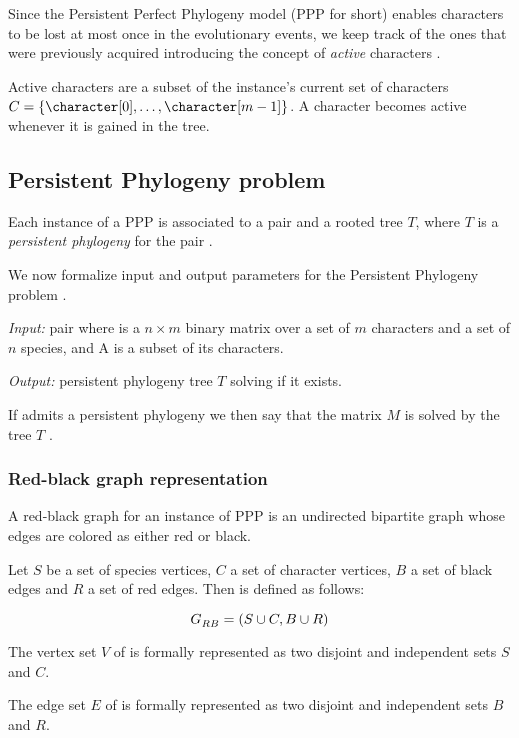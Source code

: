 Since the Persistent Perfect Phylogeny model (PPP for short) enables characters to be lost at most once in the evolutionary events, we keep track of the ones that were previously acquired introducing the concept of \emph{active} characters \cite{PPPbin2012, PPPcgraph2016, PPPptime2016}.

Active characters are a subset of the instance's current set of characters $C = \{ \character[0], \dots, \character[m-1] \}$.
A character becomes active whenever it is gained in the tree.

\subsection{Persistent Phylogeny problem}\label{section:ppp}

Each instance of a PPP is associated to a pair \ma{} and a rooted tree $T$, where $T$ is a \emph{persistent phylogeny} for the pair \ma{}.

We now formalize input and output parameters for the Persistent Phylogeny problem \cite{PPPptime2016}.

\begin{definition}\label{definition:ppp}
  \text{}

  \textit{Input:} pair \ma{} where \m{} is a $n \times m$ binary matrix over a set of $m$ characters and a set of $n$ species, and A is a subset of its characters.

  \textit{Output:} persistent phylogeny tree $T$ solving \m{} if it exists.
\end{definition}

If \ma{} admits a persistent phylogeny we then say that the matrix $M$ is solved by the tree $T$ \cite{PPPptime2016,PPPcgraph2016}.

\subsubsection{Red-black graph representation}\label{section:grb}

A red-black graph for an instance of PPP is an undirected bipartite graph whose edges are colored as either red or black.

\begin{definition}\label{definition:grb}
  Let $S$ be a set of species vertices, $C$ a set of character vertices, $B$ a set of black edges and $R$ a set of red edges.
  Then \grb{} is defined as follows:

  \[ G_{RB}^{}{} = (S \cup C, B \cup R) \]

  The vertex set $V$ of \grb{} is formally represented as two disjoint and independent sets $S$ and $C$.

  The edge set $E$ of \grb{} is formally represented as two disjoint and independent sets $B$ and $R$.
\end{definition}


